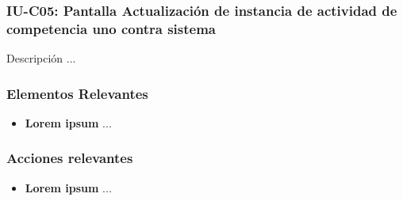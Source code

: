 
\subsubsection{IU-C05: Pantalla Actualización de instancia de actividad de competencia uno contra sistema}

 Descripción ...


\subsubsection{Elementos Relevantes}

    \begin{itemize}
    \item {\bf Lorem ipsum}
        ...
    \end{itemize}

\subsubsection{Acciones relevantes}

    \begin{itemize}
    \item {\bf Lorem ipsum}
        ...
    \end{itemize}

\clearpage
